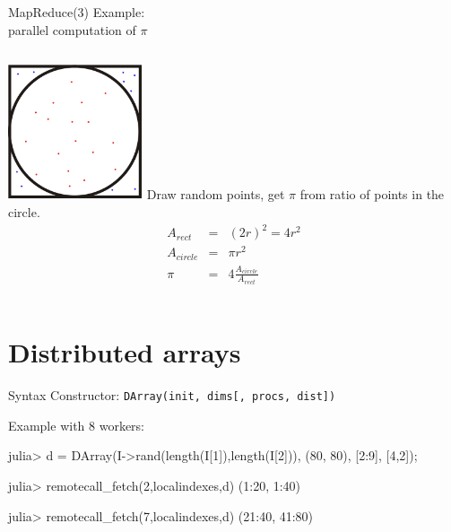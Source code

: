 \documentclass{beamer}
\begin{document}
	\begin{frame}{MapReduce(3)}
		Example: \\
		parallel computation of $\pi$
		\begin{columns}[c]
			\includegraphics[height=4cm]{figures/square_circle.jpg}
			Draw random points, get $\pi$ from ratio of points in the circle.
			\begin{equation*}
				\begin{array}{rcl}		
					A_{rect} & = & (2r)^2 = 4r^2 \\
					A_{circle} & = & \pi r^2 \\
					\pi & = & 4\frac{A_{circle}}{A_{rect}}
				\end{array}
			\end{equation*}
		\end{columns}
	\end{frame}

	\section{Distributed arrays}
	\begin{frame}[fragile]{Syntax}
    Constructor: \verb+DArray(init, dims[, procs, dist])+
		\begin{block}{Example with 8 workers:}
		\begin{semiverbatim}
		julia> d = DArray(I->rand(length(I[1]),length(I[2])),
											(80, 80), 
											[2:9], 
											[4,2]);	
		
		julia> remotecall\_fetch(2,localindexes,d)
		(1:20, 1:40)
		
		julia> remotecall\_fetch(7,localindexes,d)
		(21:40, 41:80)
		\end{semiverbatim}
		\end{block}
	\end{frame}
\end{document}
